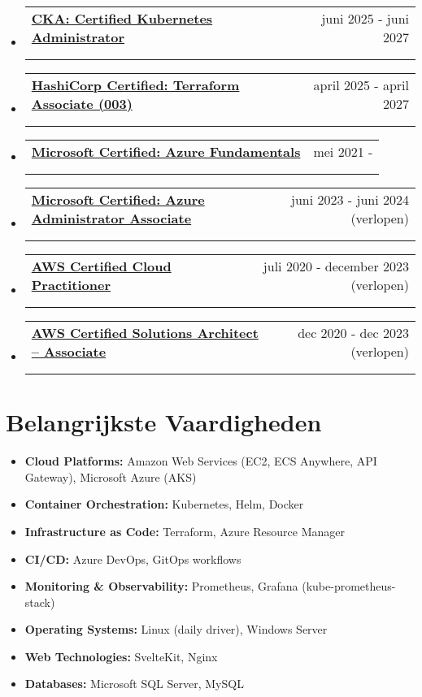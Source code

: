 \documentclass[11pt,a4paper]{article}
\makeatletter
\newcommand{\resumesubheading}[4]{%
  \vspace{-1pt}\item
    \begin{tabular*}{0.97\textwidth}[t]{l@{\extracolsep{\fill}}r}
      \textbf{#1} & #2 \\
      \ifthenelse{\equal{#3}{} \and \equal{#4}{}}{}{%
        \textit{\small#3} & \textit{\small #4} \\
      }%
    \end{tabular*}\vspace{-5pt}%
}
\makeatother
\begin{document}
\begin{itemize}[leftmargin=0.15in, label={}]
\resumesubheading
    {\textbf{\href{https://www.credly.com/badges/c97d067a-1264-442e-8c1c-e4f84b560517}{CKA: Certified Kubernetes Administrator}}}{juni 2025 - juni 2027}
    {DevOps}{}

\resumesubheading
    {\textbf{\href{https://www.credly.com/badges/1794fdf2-ca6e-4538-ab59-ab42f042c8b6}{HashiCorp Certified: Terraform Associate (003)
}}}{april 2025 - april 2027}
    {DevOps}{}

\resumesubheading
    {\textbf{\href{https://www.credly.com/badges/3d2d91ca-7a8c-432a-9a1f-a858d48a5f0d}{Microsoft Certified: Azure Fundamentals}}}{mei 2021 - \infty}
    {Cloud}{}

\resumesubheading
    {\textbf{\href{https://www.credly.com/badges/4e320328-8670-4284-827f-527c1b6de2c9}{Microsoft Certified: Azure Administrator Associate}}}{juni 2023 - juni 2024 (verlopen)}
    {Cloud}{}

\resumesubheading
    {\textbf{\href{https://www.youracclaim.com/badges/ae78b326-eebb-43a1-ba83-3d62e10b2246}{AWS Certified Cloud Practitioner}}}{juli 2020 - december 2023 (verlopen)}
    {Cloud}{}

\resumesubheading
    {\textbf{\href{https://www.youracclaim.com/badges/ae0ea787-83a7-47b9-b31a-5b8eaa61a00c}{AWS Certified Solutions Architect – Associate}}}{dec 2020 - dec 2023 (verlopen)}
    {Cloud}{}
\end{itemize}

\section{Belangrijkste Vaardigheden}

\begin{itemize}[leftmargin=0.25in, label={}]
\item \textbf{Cloud Platforms:} Amazon Web Services (EC2, ECS Anywhere, API Gateway), Microsoft Azure (AKS)
\item \textbf{Container Orchestration:} Kubernetes, Helm, Docker
\item \textbf{Infrastructure as Code:} Terraform, Azure Resource Manager
\item \textbf{CI/CD:} Azure DevOps, GitOps workflows
\item \textbf{Monitoring \& Observability:} Prometheus, Grafana (kube-prometheus-stack)
\item \textbf{Operating Systems:} Linux (daily driver), Windows Server
\item \textbf{Web Technologies:} SvelteKit, Nginx
\item \textbf{Databases:} Microsoft SQL Server, MySQL
\end{itemize}
\end{document}

